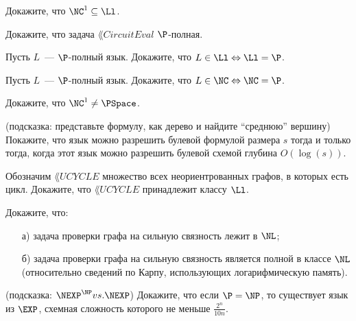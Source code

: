 
\begin{task}
    Докажите, что $\NC^1 \subseteq \Ll$.
\end{task}

\begin{task}
    Докажите, что задача $\lang{CircuitEval}$ $\P$-полная.
\end{task}

\begin{task}
    Пусть $L$~--- $\P$-полный язык. Докажите, что $L \in \Ll \Leftrightarrow \Ll = \P$.
\end{task}

\begin{task}
    Пусть $L$~--- $\P$-полный язык. Докажите, что $L \in \NC \Leftrightarrow \NC = \P$.
\end{task}

\begin{task}
    Докажите, что $\NC^1 \neq \PSpace$.
\end{task}

\begin{task} (подсказка: представьте формулу, как дерево и найдите ``среднюю'' вершину)
    Покажите, что язык можно разрешить булевой формулой размера $s$ тогда и только тогда, когда этот язык можно разрешить булевой
    схемой глубина $O(\log(s))$.
\end{task}

\breakline

\begin{ptask}{31}
	Обозначим $\lang{UCYCLE}$ множество всех неориентрованных графов, в которых есть цикл. Докажите, что $\lang{UCYCLE}$
    принадлежит классу $\Ll$. 
\end{ptask}


\begin{ptask}{24}
    Докажите, что:
    \begin{enumerate}[topsep = 0pt, itemsep = -1ex]
        \item [а)] задача проверки графа на сильную связность лежит в $\NL$;
        \item [б)] задача проверки графа на сильную связность является полной в классе $\NL$ (относительно сведений по Карпу,
            использующих логарифмическую память).
	\end{enumerate}
\end{ptask}

\begin{ptask}{26}(подсказка: $\NEXP^{\NP} vs. \NEXP$)
    Докажите, что если $\P = \NP$, то существует язык из $\EXP$, схемная сложность которого не меньше $\frac{2^n}{10 n}$.
\end{ptask}

